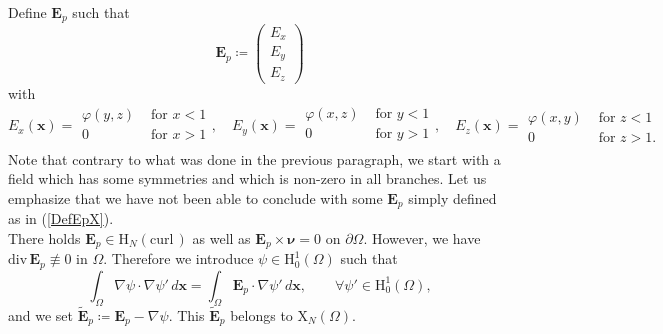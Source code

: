 \documentclass[11pt,a4paper]{article}
\newcommand{\Om}{\Omega}
\newcommand{\mrm}[1]{\mathrm{#1}}
\newcommand{\bfx}{\boldsymbol{x}}
\newcommand{\bfnu}{\boldsymbol{\nu}}
\newcommand{\mH}{\mrm{H}}
\newcommand{\mX}{\mrm{X}}
\newcommand{\curlvec}{\boldsymbol{\mrm{curl}}\,}
\renewcommand{\div}{\mrm{div}}
\def\E{\boldsymbol{E}}
\begin{document}
Define $\E_p$ such that 
\[
\E_p\coloneqq\left(\begin{array}{c}
E_x\\
E_y\\
E_z
\end{array}\right)
\]
with
\[
E_x(\bfx)=\begin{array}{|ll}
\varphi(y,z)& \mbox{ for }x<1\\
0& \mbox{ for }x>1\\
\end{array},\quad E_y(\bfx)=\begin{array}{|ll}
\varphi(x,z)& \mbox{ for }y<1\\
0& \mbox{ for }y>1\\
\end{array},\quad E_z(\bfx)=\begin{array}{|ll}
\varphi(x,y)& \mbox{ for }z<1\\
0& \mbox{ for }z>1.
\end{array}
\]
Note that contrary to what was done in the previous paragraph, we start with a field which has some symmetries and which is non-zero in all branches. Let us emphasize that we have not been able to conclude with some $\E_p$ simply defined as in (\ref{DefEpX}).\\
There holds $\E_{p}\in \boldsymbol{\mH}_N(\curlvec)$ as well as $\E_{p}\times\bfnu=0$ on $\partial\Om$. However, we have $\div\,\E_{p}\not\equiv0$ in $\Om$. Therefore we introduce $\psi\in\mH^1_0(\Om)$ such that
\begin{equation}\label{PbDefPsiBis}
\int_\Om\nabla\psi\cdot\nabla\psi'\,d\bfx=\int_\Om\E_{p}\cdot\nabla\psi'\,d\bfx,\qquad \forall\psi'\in\mH^1_0(\Om),
\end{equation}
and we set $\tilde{\E}_{p}\coloneqq\E_{p}-\nabla\psi$. This $\tilde{\E}_{p}$ belongs to $\boldsymbol{\mX}_N(\Om)$. 
\end{document}
